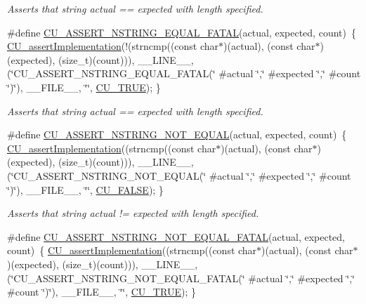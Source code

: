 \begin{DoxyCompactItemize}
\begin{DoxyCompactList}\small\item\em Asserts that string actual == expected with length specified. \end{DoxyCompactList}\item 
\#define \hyperlink{group__Framework_ga4677d7fc21073d3e22f2e8dc28409d31}{C\-U\-\_\-\-A\-S\-S\-E\-R\-T\-\_\-\-N\-S\-T\-R\-I\-N\-G\-\_\-\-E\-Q\-U\-A\-L\-\_\-\-F\-A\-T\-A\-L}(actual, expected, count)~\{ \hyperlink{group__Framework_ga31a858e8b496b2af992b63902064c5fa}{C\-U\-\_\-assert\-Implementation}(!(strncmp((const char$\ast$)(actual), (const char$\ast$)(expected), (size\-\_\-t)(count))), \-\_\-\-\_\-\-L\-I\-N\-E\-\_\-\-\_\-, (\char`\"{}C\-U\-\_\-\-A\-S\-S\-E\-R\-T\-\_\-\-N\-S\-T\-R\-I\-N\-G\-\_\-\-E\-Q\-U\-A\-L\-\_\-\-F\-A\-T\-A\-L(\char`\"{} \#actual \char`\"{},\char`\"{}  \#expected \char`\"{},\char`\"{} \#count \char`\"{})\char`\"{}), \-\_\-\-\_\-\-F\-I\-L\-E\-\_\-\-\_\-, \char`\"{}\char`\"{}, \hyperlink{group__Framework_ga99641394bc766ca9c4a295e942fed1ef}{C\-U\-\_\-\-T\-R\-U\-E}); \}
\begin{DoxyCompactList}\small\item\em Asserts that string actual == expected with length specified. \end{DoxyCompactList}\item 
\#define \hyperlink{group__Framework_ga19279e7a9b9b4479996c1ce91dbe03f5}{C\-U\-\_\-\-A\-S\-S\-E\-R\-T\-\_\-\-N\-S\-T\-R\-I\-N\-G\-\_\-\-N\-O\-T\-\_\-\-E\-Q\-U\-A\-L}(actual, expected, count)~\{ \hyperlink{group__Framework_ga31a858e8b496b2af992b63902064c5fa}{C\-U\-\_\-assert\-Implementation}((strncmp((const char$\ast$)(actual), (const char$\ast$)(expected), (size\-\_\-t)(count))), \-\_\-\-\_\-\-L\-I\-N\-E\-\_\-\-\_\-, (\char`\"{}C\-U\-\_\-\-A\-S\-S\-E\-R\-T\-\_\-\-N\-S\-T\-R\-I\-N\-G\-\_\-\-N\-O\-T\-\_\-\-E\-Q\-U\-A\-L(\char`\"{} \#actual \char`\"{},\char`\"{}  \#expected \char`\"{},\char`\"{} \#count \char`\"{})\char`\"{}), \-\_\-\-\_\-\-F\-I\-L\-E\-\_\-\-\_\-, \char`\"{}\char`\"{}, \hyperlink{group__Framework_ga7453214541b156ef868681eaafe60860}{C\-U\-\_\-\-F\-A\-L\-S\-E}); \}
\begin{DoxyCompactList}\small\item\em Asserts that string actual != expected with length specified. \end{DoxyCompactList}\item 
\#define \hyperlink{group__Framework_ga5abbd2ca633ff3a24b996461fe47f1ac}{C\-U\-\_\-\-A\-S\-S\-E\-R\-T\-\_\-\-N\-S\-T\-R\-I\-N\-G\-\_\-\-N\-O\-T\-\_\-\-E\-Q\-U\-A\-L\-\_\-\-F\-A\-T\-A\-L}(actual, expected, count)~\{ \hyperlink{group__Framework_ga31a858e8b496b2af992b63902064c5fa}{C\-U\-\_\-assert\-Implementation}((strncmp((const char$\ast$)(actual), (const char$\ast$)(expected), (size\-\_\-t)(count))), \-\_\-\-\_\-\-L\-I\-N\-E\-\_\-\-\_\-, (\char`\"{}C\-U\-\_\-\-A\-S\-S\-E\-R\-T\-\_\-\-N\-S\-T\-R\-I\-N\-G\-\_\-\-N\-O\-T\-\_\-\-E\-Q\-U\-A\-L\-\_\-\-F\-A\-T\-A\-L(\char`\"{} \#actual \char`\"{},\char`\"{}  \#expected \char`\"{},\char`\"{} \#count \char`\"{})\char`\"{}), \-\_\-\-\_\-\-F\-I\-L\-E\-\_\-\-\_\-, \char`\"{}\char`\"{}, \hyperlink{group__Framework_ga99641394bc766ca9c4a295e942fed1ef}{C\-U\-\_\-\-T\-R\-U\-E}); \}

\end{DoxyCompactItemize}
